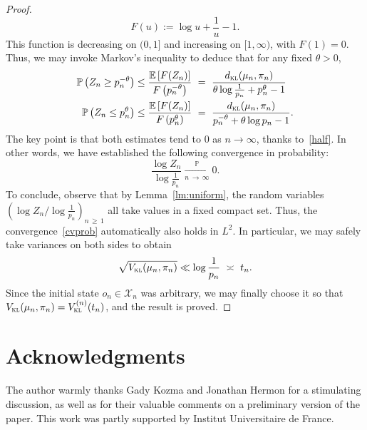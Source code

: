 \documentclass[10pt]{amsart}
\theoremstyle{definition}\newtheorem{defi}[theo]{Definition}\newtheorem{rema}[theo]{Remark}\newtheorem{exam}[theo]{Example}\newtheorem{exem}[theo]{Example}\newtheorem{nota}[theo]{Notation}
\newcommand{\EE}{{\mathbb{E}}}
\newcommand{\PP}{\mathbb{P}}
\newcommand{\cX}{\mathcal{X}}
\newcommand{\dkl}{d_{\textsc{kl}}}
\newcommand{\vkl}{V_{\textsc{kl}}}
\begin{document}
\begin{proof}
\[
F(u) := \log u+\frac{1}{u}-1.
\]
This function is decreasing on $(0,1]$ and increasing on $[1,\infty)$, with $F(1)=0$. Thus, we may invoke Markov's inequality to deduce that for any fixed $\theta>0$,
\begin{align*}
\PP\left(Z_n\ge p_n^{-\theta}\right) & \le \frac{\EE\left[F(Z_n)\right]}{F\left(p_n^{-\theta}\right)} \ = \ \frac{\dkl(\mu_n,\pi_n)}{\theta\log \frac{1}{p_n} +p_n^{\theta}-1} \\
\PP\left(Z_n\le p_n^{\theta}\right) & \le \frac{\EE\left[F(Z_n)\right]}{F\left(p_n^{\theta}\right)} \ = \ \frac{\dkl(\mu_n,\pi_n)}{p_n^{-\theta}+\theta\log p_n-1}.
\end{align*}
The key point is that both estimates tend to $0$ as $n\to\infty$, thanks to~\eqref{half}. In other words, we have established the following convergence in probability:
\begin{equation}\label{cvprob}
\frac{\log Z_n}{\log \frac{1}{p_n}} \xrightarrow[n\,\to\,\infty]{\PP} 0.
\end{equation}
To conclude, observe that by Lemma~\ref{lm:uniform}, the random variables $\left({\log Z_n}/{\log \frac{1}{p_n}}\right)_{n\,\ge\,1}$ all take values in a fixed compact set. Thus, the convergence~\eqref{cvprob} automatically also holds in $L^2$. In particular, we may safely take variances on both sides to obtain
\[
\sqrt{\vkl(\mu_n,\pi_n)} \ll \log\frac{1}{p_n} \ \asymp \ t_n.
\]
Since the initial state $o_n\in\cX_n$ was arbitrary, we may finally choose it so that $\vkl(\mu_n,\pi_n)=\vkl^{(n)}(t_n)$, and the result is proved.
\end{proof}


\section*{Acknowledgments}

The author warmly thanks Gady Kozma and Jonathan Hermon for a stimulating discussion, as well as for their valuable comments on a preliminary version of the paper. This work was partly supported by Institut Universitaire de France.
\end{document}

